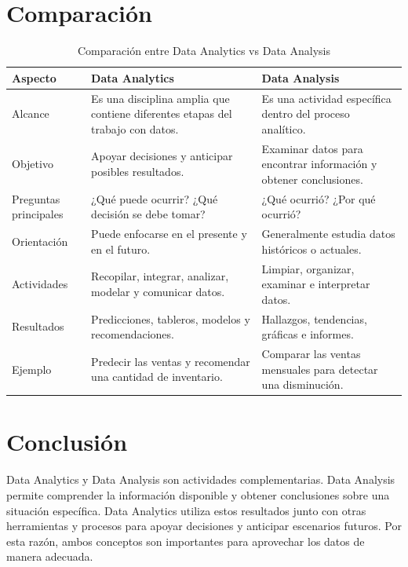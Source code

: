 \section{Comparación}

\begin{table}[H]
    \centering
    \caption{Comparación entre Data Analytics vs Data Analysis}
    \label{tab:comparacion}
    \renewcommand{\arraystretch}{1.4}
    \small

    \begin{tabularx}{\textwidth}{|p{3cm}|X|X|}
        \hline
        \textbf{Aspecto} &
        \textbf{Data Analytics} &
        \textbf{Data Analysis} \\
        \hline

        Alcance &
        Es una disciplina amplia que contiene diferentes etapas del trabajo con datos. &
        Es una actividad específica dentro del proceso analítico. \\
        \hline

        Objetivo &
        Apoyar decisiones y anticipar posibles resultados. &
        Examinar datos para encontrar información y obtener conclusiones. \\
        \hline

        Preguntas principales &
        ¿Qué puede ocurrir? ¿Qué decisión se debe tomar? &
        ¿Qué ocurrió? ¿Por qué ocurrió? \\
        \hline

        Orientación &
        Puede enfocarse en el presente y en el futuro. &
        Generalmente estudia datos históricos o actuales. \\
        \hline

        Actividades &
        Recopilar, integrar, analizar, modelar y comunicar datos. &
        Limpiar, organizar, examinar e interpretar datos. \\
        \hline

        Resultados &
        Predicciones, tableros, modelos y recomendaciones. &
        Hallazgos, tendencias, gráficas e informes. \\
        \hline

        Ejemplo &
        Predecir las ventas y recomendar una cantidad de inventario. &
        Comparar las ventas mensuales para detectar una disminución. \\
        \hline     
    \end{tabularx}
\end{table}

\section{Conclusión}
Data Analytics y Data Analysis son actividades complementarias. Data Analysis
permite comprender la información disponible y obtener conclusiones sobre una
situación específica. Data Analytics utiliza estos resultados junto con otras
herramientas y procesos para apoyar decisiones y anticipar escenarios futuros.
Por esta razón, ambos conceptos son importantes para aprovechar los datos de
manera adecuada.